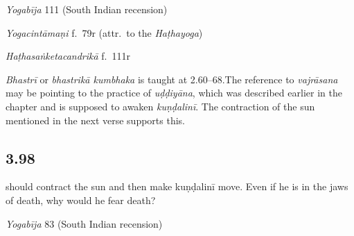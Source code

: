 \begin{ekdosis}
\begin{testimonia}[hp03_097]
\emph{Yogabīja} 111 (South Indian recension)
\begin{versinnote}
\end{versinnote}

\emph{Yogacintāmaṇi} f.~79r (attr.~to the \emph{Haṭhayoga})
\begin{versinnote}
\end{versinnote}

\emph{Haṭhasaṅketacandrikā} f.~111r
\begin{versinnote}
\end{versinnote}
\end{testimonia}

\begin{philcomm}[hp03_097]
\emph{Bhastrī} or \emph{bhastrikā kumbhaka} is taught at 2.60–68.The reference to \emph{vajrāsana} may be pointing to the practice of \emph{uḍḍiyāna}, which was described earlier in the chapter and is supposed to awaken \emph{kuṇḍalinī}. The contraction of the sun mentioned in the next verse supports this.
\end{philcomm}


\subsection*{3.98}
\begin{translation} should contract the sun and then make kuṇḍalinī move. Even if he is in the jaws of death, why would he fear death?%
\end{translation}


\begin{testimonia}[hp03_098]
\emph{Yogabīja} 83 (South Indian recension)
\begin{versinnote}
\tl{\var{mṛtyuvartma° ] mṛtyuvaktra°,  mṛtyuvajra°, mṛtyupadma° \vl}\\!}
\end{versinnote}


\end{testimonia}
\end{ekdosis}

